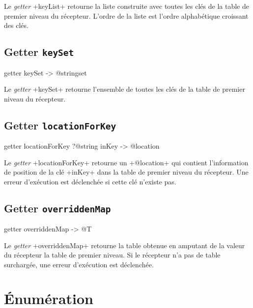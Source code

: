 Le \emph{getter} \ggs+keyList+ retourne la liste construite avec toutes les clés de la table de premier niveau du récepteur. L'ordre de la liste est l'ordre alphabétique croissant des clés.



\subsection{Getter \texttt{keySet}}

\begin{galgas}
getter keySet -> @stringset
\end{galgas}


Le \emph{getter} \ggs+keySet+ retourne l'ensemble de toutes les clés de la table de premier niveau du récepteur.





\subsection{Getter \texttt{locationForKey}}

\begin{galgas}
getter locationForKey ?@string inKey -> @location
\end{galgas}


Le \emph{getter} \ggs+locationForKey+ retourne un \ggs+@location+ qui contient l'information de position de la clé \ggs+inKey+ dans la table de premier niveau du récepteur. Une erreur d'exécution est déclenchée si cette clé n'existe pas.








\subsection{Getter \texttt{overriddenMap}}

\begin{galgas}
getter overriddenMap -> @T
\end{galgas}


Le \emph{getter} \ggs+overriddenMap+ retourne la table obtenue en amputant de la valeur du récepteur la table de premier niveau. Si le récepteur n'a pas de table surchargée, une erreur d'exécution est déclenchée.





\section{Énumération}

